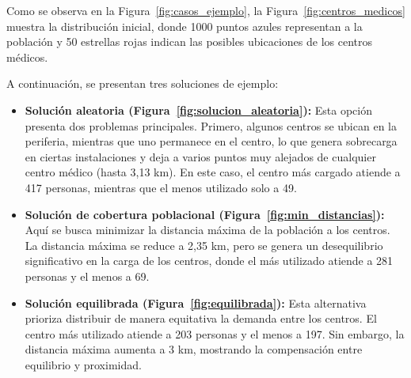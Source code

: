 \documentclass[12pt,a4paper]{book}
\begin{document}

Como se observa en la Figura~\ref{fig:casos_ejemplo}, la Figura~\ref{fig:centros_medicos} muestra la distribución inicial, donde 1000 puntos azules representan a la población y 50 estrellas rojas indican las posibles ubicaciones de los centros médicos.

A continuación, se presentan tres soluciones de ejemplo:

\begin{itemize}
    \item \textbf{Solución aleatoria (Figura~\ref{fig:solucion_aleatoria}):} Esta opción presenta dos problemas principales. Primero, algunos centros se ubican en la periferia, mientras que uno permanece en el centro, lo que genera sobrecarga en ciertas instalaciones y deja a varios puntos muy alejados de cualquier centro médico (hasta 3,13 km). En este caso, el centro más cargado atiende a 417 personas, mientras que el menos utilizado solo a 49.
    \item \textbf{Solución de cobertura poblacional (Figura~\ref{fig:min_distancias}):} Aquí se busca minimizar la distancia máxima de la población a los centros. La distancia máxima se reduce a 2,35 km, pero se genera un desequilibrio significativo en la carga de los centros, donde el más utilizado atiende a 281 personas y el menos a 69.
    \item \textbf{Solución equilibrada (Figura~\ref{fig:equilibrada}):} Esta alternativa prioriza distribuir de manera equitativa la demanda entre los centros. El centro más utilizado atiende a 203 personas y el menos a 197. Sin embargo, la distancia máxima aumenta a 3 km, mostrando la compensación entre equilibrio y proximidad.
\end{itemize}
\end{document}
